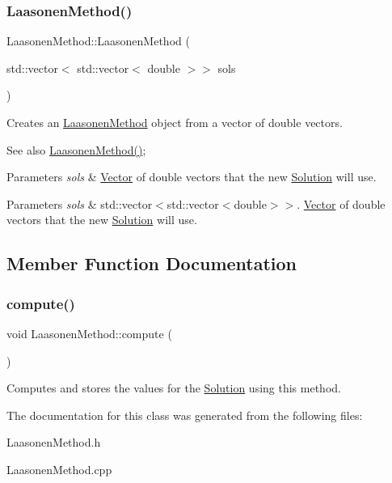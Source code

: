 \subsubsection{\texorpdfstring{Laasonen\+Method()}{LaasonenMethod()}\hspace{0.1cm}{\footnotesize\ttfamily [2/2]}}
{\footnotesize\ttfamily Laasonen\+Method\+::\+Laasonen\+Method (\begin{DoxyParamCaption}\item[{std\+::vector$<$ std\+::vector$<$ double $>$$>$}]{sols }\end{DoxyParamCaption})}

Creates an \hyperlink{class_laasonen_method}{Laasonen\+Method} object from a vector of double vectors. \begin{DoxySeeAlso}{See also}
\hyperlink{class_laasonen_method_a1bff2dc73fc66c3070fc7a187ff556f9}{Laasonen\+Method()}; 
\end{DoxySeeAlso}

\begin{DoxyParams}{Parameters}
{\em sols} & \hyperlink{class_vector}{Vector} of double vectors that the new \hyperlink{class_solution}{Solution} will use. \\
\hline
\end{DoxyParams}

\begin{DoxyParams}{Parameters}
{\em sols} & std\+::vector$<$std\+::vector$<$double$>$$>$. \hyperlink{class_vector}{Vector} of double vectors that the new \hyperlink{class_solution}{Solution} will use. \\
\hline
\end{DoxyParams}


\subsection{Member Function Documentation}
\mbox{\label{class_laasonen_method_ac5507d58a6c59f0ba9eaa3ca54a51f5d}} 
\subsubsection{\texorpdfstring{compute()}{compute()}}
{\footnotesize\ttfamily void Laasonen\+Method\+::compute (\begin{DoxyParamCaption}{ }\end{DoxyParamCaption})}

Computes and stores the values for the \hyperlink{class_solution}{Solution} using this method. 

The documentation for this class was generated from the following files\+:\begin{DoxyCompactItemize}
\item 
Laasonen\+Method.\+h\item 
Laasonen\+Method.\+cpp\end{DoxyCompactItemize}
